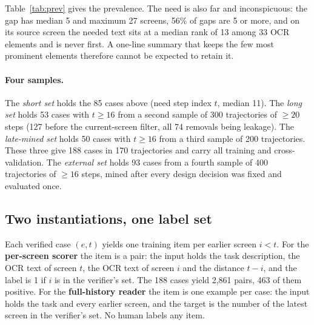 \begin{table}[t]
\centering\footnotesize\setlength{\tabcolsep}{4pt}
\caption{AITZ's 7.4-step tasks contain no delayed information need; GUI-Odyssey's 15.4-step tasks contain one in 31\% of sampled trajectories. We mine only the sampled trajectories.}
\label{tab:prev}
\end{table}

Table~\ref{tab:prev} gives the prevalence. The need is also far and inconspicuous: the gap has median 5 and maximum 27 screens, 56\% of gaps are 5 or more, and on its source screen the needed text sits at a median rank of 13 among 33 OCR elements and is never first. A one-line summary that keeps the few most prominent elements therefore cannot be expected to retain it.

\paragraph{Four samples.} The \emph{short set} holds the 85 cases above (need step index $t$, median 11). The \emph{long set} holds 53 cases with $t\ge16$ from a second sample of 300 trajectories of $\ge20$ steps (127 before the current-screen filter, all 74 removals being leakage). The \emph{late-mined set} holds 50 cases with $t\ge16$ from a third sample of 200 trajectories. These three give 188 cases in 170 trajectories and carry all training and cross-validation. The \emph{external set} holds 93 cases from a fourth sample of 400 trajectories of $\ge16$ steps, mined after every design decision was fixed and evaluated once.

\subsection{Two instantiations, one label set}
Each verified case $(e,t)$ yields one training item per earlier screen $i<t$. For the \textbf{per-screen scorer} the item is a pair: the input holds the task description, the OCR text of screen $t$, the OCR text of screen $i$ and the distance $t-i$, and the label is 1 if $i$ is in the verifier's set. The 188 cases yield 2,861 pairs, 463 of them positive. For the \textbf{full-history reader} the item is one example per case: the input holds the task and every earlier screen, and the target is the number of the latest screen in the verifier's set. No human labels any item.

